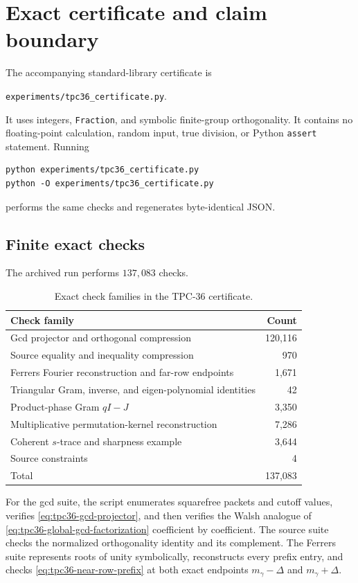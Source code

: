 \section{Exact certificate and claim boundary}
\label{sec:tpc36-certificate}

The accompanying standard-library certificate is
\begin{center}
\texttt{experiments/tpc36\_certificate.py}.
\end{center}
It uses integers, \texttt{Fraction}, and symbolic finite-group
orthogonality.  It contains no floating-point calculation, random input,
true division, or Python \texttt{assert} statement.  Running
\begin{verbatim}
python experiments/tpc36_certificate.py
python -O experiments/tpc36_certificate.py
\end{verbatim}
performs the same checks and regenerates byte-identical JSON.

\subsection{Finite exact checks}

The archived run performs \(137{,}083\) checks.

\begin{table}[H]
\centering
\caption{Exact check families in the TPC-36 certificate.}
\label{tab:tpc36-certificate-checks}
\begin{tabular}{@{}lr@{}}
\toprule
Check family & Count \\
\midrule
Gcd projector and orthogonal compression & 120,116 \\
Source equality and inequality compression & 970 \\
Ferrers Fourier reconstruction and far-row endpoints & 1,671 \\
Triangular Gram, inverse, and eigen-polynomial identities & 42 \\
Product-phase Gram \(qI-J\) & 3,350 \\
Multiplicative permutation-kernel reconstruction & 7,286 \\
Coherent \(s\)-trace and sharpness example & 3,644 \\
Source constraints & 4 \\
\midrule
Total & 137,083 \\
\bottomrule
\end{tabular}
\end{table}

For the gcd suite, the script enumerates squarefree packets and cutoff
values, verifies \eqref{eq:tpc36-gcd-projector}, and then verifies the
Walsh analogue of \eqref{eq:tpc36-global-gcd-factorization} coefficient
by coefficient.  The source suite checks the normalized orthogonality
identity and its complement.  The Ferrers suite represents roots of unity
symbolically, reconstructs every prefix entry, and checks
\eqref{eq:tpc36-near-row-prefix} at both exact endpoints
\(m_\gamma-\Delta\) and \(m_\gamma+\Delta\).


